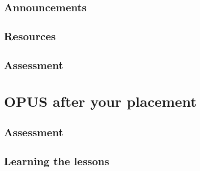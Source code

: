 \documentclass[12 pt]{book}
\begin{document}
\section{Announcements}

\section{Resources}

\section{Assessment}

%
%
%

\chapter{OPUS after your placement}

\section{Assessment}

\section{Learning the lessons}

%
%

\printindex
{}
\end{document}
